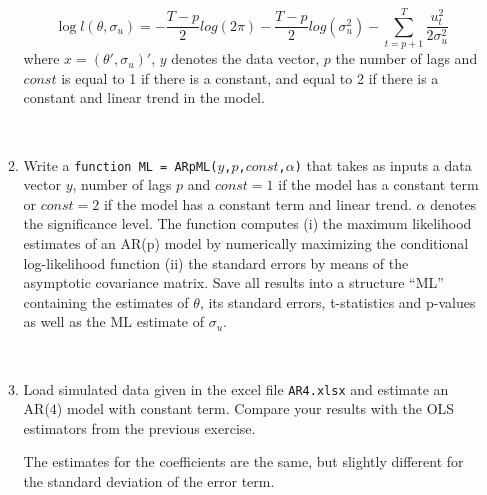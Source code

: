 \begin{enumerate}
\begin{enumerate}
                    $$ \log l(\theta,\sigma_u)= -\frac{T-p}{2}log(2\pi)-\frac{T-p}{2}log(\sigma_u^2)-\sum_{t=p+1}^{T}\frac{u_t^2}{2\sigma_u^2}$$
                    where $x=(\theta',\sigma_u)'$, $y$ denotes the data vector, $p$ the number of lags and $const$ is equal to 1 if there is a constant, and equal to 2 if there is a constant and linear trend in the model.
                    \begin{solution}~
                        
                    \end{solution}
              \item Write a \texttt{function ML = ARpML($y$,$p$,$const$,$\alpha$)} that takes as inputs a data vector $y$, number of lags $p$ and $const=1$ if the model has a constant term or $const=2$ if the model has a constant term and linear trend. $\alpha$ denotes the significance level. The function computes (i) the maximum likelihood estimates of an AR(p) model by numerically maximizing the conditional log-likelihood function (ii) the standard errors by means of the asymptotic covariance matrix. Save all results into a structure \enquote{ML} containing the estimates of $\theta$, its standard errors, t-statistics and p-values as well as the ML estimate of $\sigma_u$.
                    \begin{solution}~
                        
                    \end{solution}
              \item Load simulated data given in the excel file \texttt{AR4.xlsx} and estimate an AR(4) model with constant term. Compare your results with the OLS estimators from the previous exercise.
                    \begin{solution}
                        The estimates for the coefficients are the same, but slightly different for the standard deviation of the error term.
                        
                    \end{solution}
          \end{enumerate}
\end{enumerate}